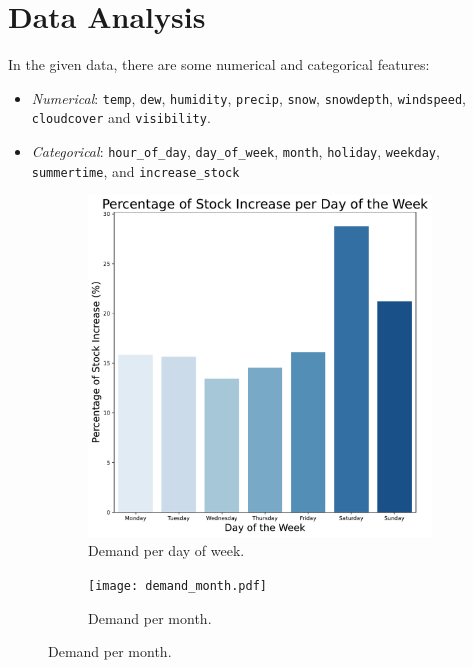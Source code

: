 \section{Data Analysis}
In the given data, there are some numerical and categorical features:
\begin{itemize}
    \item \emph{Numerical}: \texttt{temp}, \texttt{dew}, \texttt{humidity}, \texttt{precip}, \texttt{snow}, \texttt{snowdepth}, \texttt{windspeed}, \texttt{cloudcover} and \texttt{visibility}.
    \item \emph{Categorical}: \texttt{hour\_of\_day}, \texttt{day\_of\_week}, \texttt{month}, \texttt{holiday}, \texttt{weekday}, \texttt{summertime}, and \texttt{increase\_stock}
\end{itemize}

\begin{figure}[htbp]
    \centering
    \begin{subfigure}{0.45\textwidth}
        \centering
        \includegraphics[width=\textwidth]{demand_day.pdf}
        \caption{Demand per day of week.}
        \label{fig:demand day}
    \end{subfigure}
    \hfill
    \begin{subfigure}{0.45\textwidth}
        \centering
        \texttt{[image: demand\_month.pdf]}
        \caption{Demand per month.}

\end{subfigure}
\end{figure}
